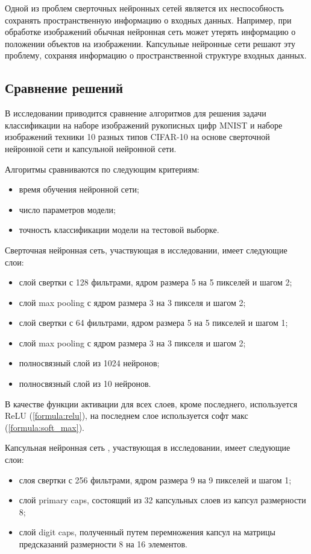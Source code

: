 Одной из проблем сверточных нейронных сетей является их неспособность сохранять пространственную информацию о входных данных. Например, при обработке изображений обычная нейронная сеть может утерять информацию о положении объектов на изображении. Капсульные нейронные сети решают эту проблему, сохраняя информацию о пространственной структуре входных данных.

\subsection{Сравнение решений}

В исследовании \cite{comparising} приводится сравнение алгоритмов для решения задачи классификации на наборе изображений рукописных цифр MNIST \cite{mnist} и наборе изображений техники 10 разных типов CIFAR-10 \cite{cifar} на основе сверточной нейронной сети и капсульной нейронной сети.

Алгоритмы сравниваются по следующим критериям:
\begin{itemize}
	\item время обучения нейронной сети;
	\item число параметров модели;
	\item точность классификации модели на тестовой выборке.
\end{itemize}

Сверточная нейронная сеть, участвующая в исследовании, имеет следующие слои:
\begin{itemize}
	\item слой свертки с 128 фильтрами, ядром размера 5 на 5 пикселей и шагом 2;
	\item слой max pooling с ядром размера 3 на 3 пикселя и шагом 2;
	\item слой свертки с 64 фильтрами, ядром размера 5 на 5 пикселей и шагом 1;
	\item слой max pooling с ядром размера 3 на 3 пикселя и шагом 2;
	\item полносвязный слой из 1024 нейронов;
	\item полносвязный слой из 10 нейронов.
\end{itemize}
В качестве функции активации для всех слоев, кроме последнего, используется ReLU (\ref{formula:relu}), на последнем слое используется софт макс (\ref{formula:soft_max}).

Капсульная нейронная сеть , участвующая в исследовании, имеет следующие слои:
\begin{itemize}
	\item слоя свертки с 256 фильтрами, ядром размера 9 на 9 пикселей и шагом 1;
	\item слой primary caps, состоящий из 32 капсульных слоев из капсул размерности 8;
	\item слой digit caps, полученный путем перемножения капсул на матрицы предсказаний размерности 8 на 16 элементов.
\end{itemize}


